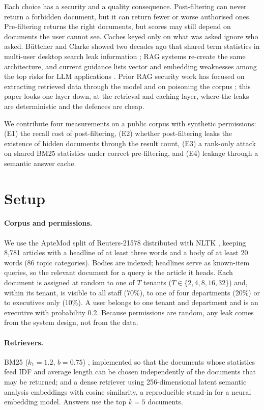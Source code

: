 \documentclass[11pt]{article}
\begin{document}
Each choice has a security and a quality consequence. Post-filtering can never return a forbidden document, but it can return fewer
or worse authorised ones. Pre-filtering returns the right documents, but scores may still depend on documents the user cannot see.
Caches keyed only on what was asked ignore who asked. Büttcher and Clarke showed two decades ago that shared term statistics in
multi-user desktop search leak information \cite{buttcher2005security}; RAG systems re-create the same architecture, and current
guidance lists vector and embedding weaknesses among the top risks for LLM applications \cite{owasp2025llm}. Prior RAG security work
has focused on extracting retrieved data through the model and on poisoning the corpus \cite{zeng2024ragprivacy,zou2025poisonedrag};
this paper looks one layer down, at the retrieval and caching layer, where the leaks are deterministic and the defences are cheap.

We contribute four measurements on a public corpus with synthetic permissions: (E1) the recall cost of post-filtering, (E2) whether
post-filtering leaks the existence of hidden documents through the result count, (E3) a rank-only attack on shared BM25 statistics
under correct pre-filtering, and (E4) leakage through a semantic answer cache.

\section{Setup}
\paragraph{Corpus and permissions.} We use the ApteMod split of Reuters-21578 \cite{apte1994reuters} distributed with NLTK
\cite{bird2009nltk}, keeping 8{,}781 articles with a headline of at least three words and a body of at least 20 words (86 topic
categories). Bodies are indexed; headlines serve as known-item queries, so the relevant document for a query is the article it heads.
Each document is assigned at random to one of \(T\) tenants (\(T\in\{2,4,8,16,32\}\)) and, within its tenant, is visible to all staff
(70\%), to one of four departments (20\%) or to executives only (10\%). A user belongs to one tenant and department and is an
executive with probability 0.2. Because permissions are random, any leak comes from the system design, not from the data.

\paragraph{Retrievers.} BM25 (\(k_1=1.2\), \(b=0.75\)) \cite{robertson2009bm25}, implemented so that the documents whose statistics feed
IDF and average length can be chosen independently of the documents that may be returned; and a dense retriever using 256-dimensional
latent semantic analysis embeddings \cite{deerwester1990lsa} with cosine similarity, a reproducible stand-in for a neural embedding
model. Answers use the top \(k=5\) documents.
\end{document}
